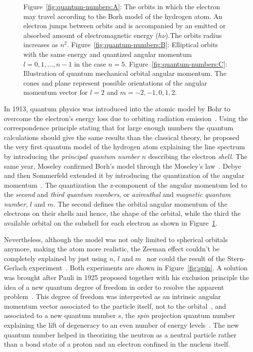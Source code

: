 \begin{figure}
\begin{minipage}{\linewidth}
			\subcaption{\label{fig:quantum-numbers:C}}
		\end{minipage}
		\caption{\label{fig:quantum-numbers} Figure~\ref{fig:quantum-numbers:A}: The orbits in which the electron may travel according to the Borh model of the hydrogen atom. An electron jumps between orbits and is accompanied by an emitted or absorbed amount of electromagnetic energy ($h\nu$).The orbits radius increases as $n^2$. Figure~\ref{fig:quantum-numbers:B}: Elliptical orbits with the same energy and quantized angular momentum $l= 0, 1,...,n-1$ in the case $n=5$. Figure~\ref{fig:quantum-numbers:C}: Illustration of quantum mechanical orbital angular momentum. The cones and plane represent possible orientations of the angular momentum vector for $l=2$ and $m=-2,-1,0,1,2$.}
		\vspace{-5pt}
	\end{figure}
	
	In 1913, quantum physics was introduced into the atomic model by Bohr to overcome the electron's energy loss due to orbiting radiation emission~\cite{BOHR1913}. Using the correspondence principle stating that for large enough numbers the quantum calculations should give the same results than the classical theory, he proposed the very first quantum model of the hydrogen atom explaining the line spectrum by introducing the \textit{principal quantum number} $n$ describing the electron \textit{shell}. The same year, Moseley confirmed Borh's model through the Moseley's law~\cite{MOSELEY1913}. Debye and then Sommerfeld extended it by introducing the quantization of the angular momentum~\cite{SOMMERFELD1916}. The quantization the z-component of the angular momentum led to the \textit{second} and \textit{third quantum numbers}, or \textit{azimuthal} and \textit{magnetic quantum number}, $l$ and $m$. The second defines the orbital angular momentum of the electrons on their shells and hence, the shape of the orbital, while the third the available orbital on the subshell for each electron as shown in Figure~\ref{fig:quantum-numbers}.
	
	Nevertheless, although the model was not only limited to spherical orbitals anymore, making the atom more realistic, the Zeeman effect couldn't be completely explained by just using $n$, $l$ and $m$~\cite{ZEEMAN431897,ZEEMAN441897I,ZEEMAN441897II,ZEEMAN451898} nor could the result of the Stern-Gerlach experiment~\cite{GERLACH1922}. Both experiments are shown in Figure~\ref{fig:spin}. A solution was brought after Pauli in 1925 proposed together with his exclusion principle the idea of a new quantum degree of freedom in order to resolve the apparent problem~\cite{PAULI1925I,PAULI1925II}. This degree of freedom was interpreted as an intrinsic angular momentum vector associated to the particle itself, not to the orbital~\cite{UHLENBECK1926}, and associated to a new quantum number $s$, the \textit{spin} projection quantum number explaining the lift of degeneracy to an even number of energy levels~\cite{PAULI1927}. The new quantum number helped in theorizing the neutron as a neutral particle rather than a bond state of a proton and an electron confined in the nucleus itself.
	
